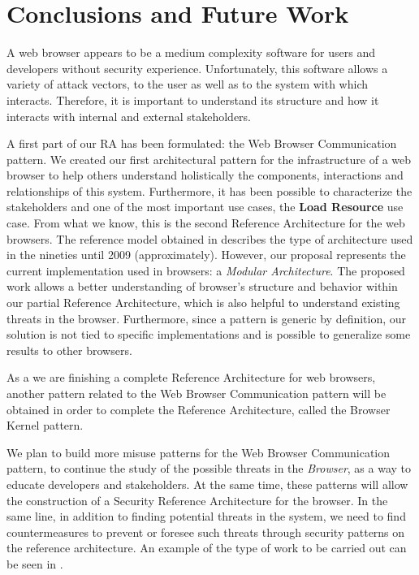 \documentclass[]{acmlarge}
\begin{document}
\section{Conclusions and Future Work}
A web browser appears to be a medium complexity software for users and developers without security experience. Unfortunately, this software allows a variety of attack vectors, to the user as well as to the system with which interacts. Therefore, it is important to understand its structure and how it interacts with internal and external stakeholders.

A first part of our RA has been formulated: the Web Browser Communication pattern. We created our first architectural pattern for the infrastructure of a web browser to help others understand holistically the components, interactions and relationships of this system. Furthermore, it has been possible to characterize the stakeholders and one of the most important use cases, the \textbf{Load Resource} use case. From what we know, this is the second Reference Architecture for the web browsers. The reference model obtained in \cite{2005-grosskurth-browser-refarch} describes the type of architecture used in the nineties until 2009 (approximately). However, our proposal represents the current implementation used in browsers: a \textit{Modular Architecture}. The proposed work allows a better understanding of browser's structure and behavior within our partial Reference Architecture, which is also helpful to understand existing threats in the browser. Furthermore, since a pattern is generic by definition, our solution is not tied to specific implementations and is possible to generalize some results to other browsers. 

As a we are finishing a complete Reference Architecture for web browsers, another pattern related to the Web Browser Communication pattern will be obtained in order to complete the Reference Architecture, called the Browser Kernel pattern. 

We plan to build more \cite{silva2015b} misuse patterns for the Web Browser Communication pattern, to continue the study of the possible threats in the \textit{Browser}, as a way to educate developers and stakeholders. At the same time, these patterns will allow the construction of a Security Reference Architecture for the browser. In the same line, in addition to finding potential threats in the system, we need to find countermeasures to prevent or foresee such threats through security patterns on the reference architecture. An example of the type of work to be carried out can be seen in \cite{Fernandez2016}.
\end{document}
